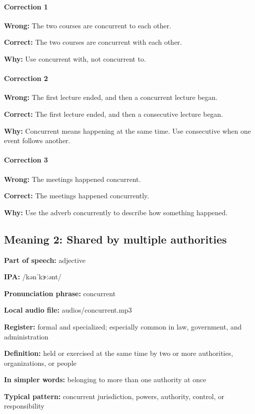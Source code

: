 \documentclass[11pt]{article}
\begin{document}
\paragraph{Correction 1}
\textbf{Wrong:} The two courses are concurrent to each other.

\textbf{Correct:} The two courses are concurrent with each other.

\textbf{Why:} Use concurrent with, not concurrent to.

\paragraph{Correction 2}
\textbf{Wrong:} The first lecture ended, and then a concurrent lecture began.

\textbf{Correct:} The first lecture ended, and then a consecutive lecture began.

\textbf{Why:} Concurrent means happening at the same time. Use consecutive when one event follows another.

\paragraph{Correction 3}
\textbf{Wrong:} The meetings happened concurrent.

\textbf{Correct:} The meetings happened concurrently.

\textbf{Why:} Use the adverb concurrently to describe how something happened.

\subsection{Meaning 2: Shared by multiple authorities}
\textbf{Part of speech:} adjective

\textbf{IPA:} /kənˈkɝːənt/

\textbf{Pronunciation phrase:} concurrent

\textbf{Local audio file:} audios/concurrent.mp3

\textbf{Register:} formal and specialized; especially common in law, government, and administration

\textbf{Definition:} held or exercised at the same time by two or more authorities, organizations, or people

\textbf{In simpler words:} belonging to more than one authority at once

\textbf{Typical pattern:} concurrent jurisdiction, powers, authority, control, or responsibility
\end{document}
